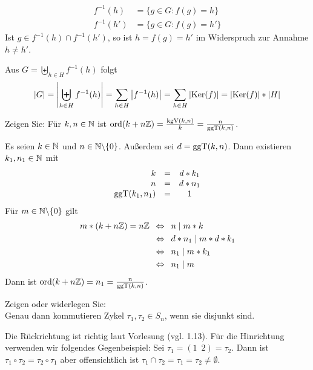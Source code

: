 \begin{exercisePage}
\begin{solution}
\begin{itemize}
		\begin{align*}
			f^{-1}(h) & = \{ g \in G : f(g) = h \} \\
			f^{-1}(h') & = \{ g \in G : f(g) = h' \}
		\end{align*}
		Ist $g \in f^{-1}(h) \cap f^{-1}(h')$, so ist $h = f(g) = h'$ im Widerspruch zur Annahme $h \neq h'$. \par
		Aus $G = \biguplus \limits_{h \in H}{f^{-1}(h)}$ folgt 
		\begin{equation*}
			\left| G \right| = \left| \biguplus \limits_{h \in H}{f^{-1}(h)} \right| 
            = \sum\limits_{h \in H}{\left| f^{-1}(h) \right|}
			= \sum\limits_{h \in H}{\left| \operatorname{Ker}(f) \right|}
			= \left| \operatorname{Ker}(f) \right| * \left| H \right|
		\end{equation*}
	\end{itemize}
\end{solution}
%
\pagebreak
%
\begin{exercise}
	Zeigen Sie: Für $k,n \in \mathbb{N}$ ist $\operatorname{ord}(k+n\mathbb{Z}) = \frac{\operatorname{kgV}(k,n)}{k} = \frac{n}{\operatorname{ggT}(k,n)}$.
\end{exercise}
\begin{solution}
	Es seien $k \in \mathbb{N}$ und $n \in \mathbb{N} \backslash \{0\}$. Außerdem sei $d = \operatorname{ggT}(k,n)$. Dann existieren $k_1, n_1 \in \mathbb{N}$ mit 
	\begin{align*}
		\begin{array}{rcc}
		k &=& d * k_1 \\ n &=& d * n_1 \\ \operatorname{ggT}(k_1, n_1) &=& 1
		\end{array}
	\end{align*}
	Für $m \in \mathbb{N} \backslash \{ 0 \}$ gilt 
	\begin{align*}
		m * (k + n\mathbb{Z}) = n\mathbb{Z} & \enskip \Leftrightarrow \enskip n \mid  m*k \\
		& \enskip \Leftrightarrow \enskip d * n_1 \mid m * d * k_1 \\
		& \enskip \Leftrightarrow \enskip n_1 \mid m * k_1 \\
		& \enskip \Leftrightarrow \enskip n_1 \mid m
	\end{align*}
	Dann ist $\operatorname{ord}(k + n\mathbb{Z}) = n_1 = \frac{n}{\operatorname{ggT}(k,n)}$.
\end{solution}
%
\setcounter{taskcount}{16}
%
\begin{exercise} [Präsenz]
	Zeigen oder widerlegen Sie: \\
	Genau dann kommutieren Zykel $\tau_1, \tau_2 \in S_n$, wenn sie disjunkt sind.
\end{exercise}
\begin{solution}
	Die Rückrichtung ist richtig laut Vorlesung (vgl. 1.13). Für die Hinrichtung verwenden wir folgendes Gegenbeispiel: Sei $\tau_1=(1 \enspace 2) = \tau_2$. Dann ist $\tau_1 \circ \tau_2 = \tau_2 \circ \tau_1$ aber offensichtlich ist $\tau_1 \cap \tau_2 = \tau_1 = \tau_2 \neq \emptyset$.
\end{solution}


\end{exercisePage}
